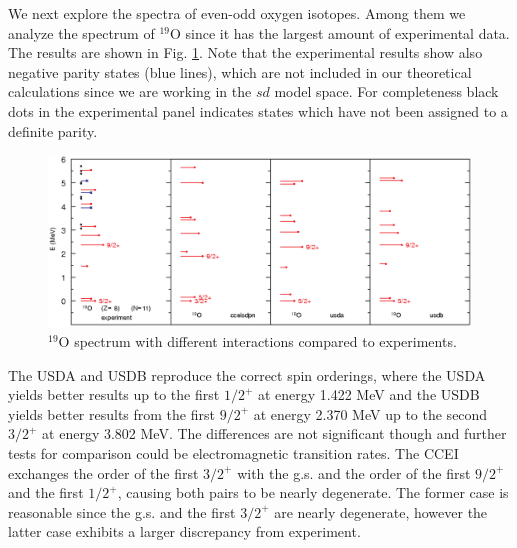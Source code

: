 We next explore the spectra of even-odd oxygen isotopes. Among them we analyze the spectrum of $^{19}$O since it has the largest amount of experimental data. The results are shown in Fig. \ref{fig:19O}. Note that the experimental results show also negative parity states (blue lines), which are not included in our theoretical calculations since we are working in the $sd$ model space. For completeness black dots in the experimental panel indicates states which have not been assigned to a definite parity.

\onecolumngrid

\begin{figure}[htb!]
\centering
\includegraphics[width=\textwidth]{19O.eps}
\caption{$^{19}$O spectrum with different interactions compared to experiments.}
\label{fig:19O}
\end{figure}

\twocolumngrid

The USDA and USDB reproduce the correct spin orderings, where the USDA yields better results up to the first $1/2^+$ at energy 1.422 MeV and the USDB yields better results from the first $9/2^+$ at energy 2.370 MeV up to the second $3/2^+$ at energy 3.802 MeV. The differences are not significant though and further tests for comparison could be electromagnetic transition rates.
The CCEI exchanges the order of the first $3/2^+$ with the g.s. and the order of the first $9/2^+$ and the first $1/2^+$, causing both pairs to be nearly degenerate. The former case is reasonable since the g.s. and the first $3/2^+$ are nearly degenerate,  however the latter case exhibits a larger discrepancy from experiment.

%
